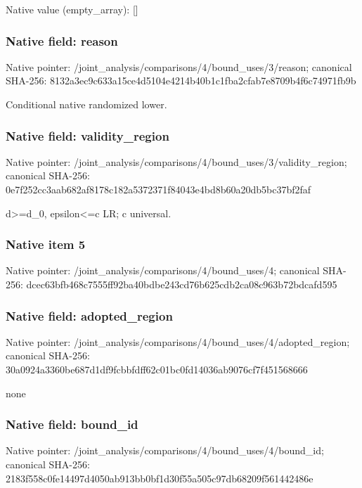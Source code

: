 \documentclass[10pt,a4paper]{article}
\begin{document}
Native value (empty\_\allowbreak{}array): []

\subsubsection{Native field: reason}
Native pointer: /joint\_\allowbreak{}analysis/comparisons/4/bound\_\allowbreak{}uses/3/reason; canonical SHA-256: 8132a3ec9c633a15ce4d5104e4214b40b1c1fba2cfab7e8709b4f6c74971fb9b

\begingroup\raggedright\sloppy Conditional native randomized lower.\par\endgroup

\subsubsection{Native field: validity\_\allowbreak{}region}
Native pointer: /joint\_\allowbreak{}analysis/comparisons/4/bound\_\allowbreak{}uses/3/validity\_\allowbreak{}region; canonical SHA-256: 0e7f252cc3aab682af8178c182a5372371f84043e4bd8b60a20db5bc37bf2faf

\begingroup\raggedright\sloppy d>=\allowbreak{}d\_\allowbreak{}0,\allowbreak{} epsilon<=\allowbreak{}c LR;\allowbreak{} c universal.\par\endgroup

\subsubsection{Native item 5}
Native pointer: /joint\_\allowbreak{}analysis/comparisons/4/bound\_\allowbreak{}uses/4; canonical SHA-256: dcec63bfb468c7555ff92ba40bdbe243cd76b625cdb2ca08c963b72bdcafd595

\subsubsection{Native field: adopted\_\allowbreak{}region}
Native pointer: /joint\_\allowbreak{}analysis/comparisons/4/bound\_\allowbreak{}uses/4/adopted\_\allowbreak{}region; canonical SHA-256: 30a0924a3360be687d1df9fcbbfdff62c01bc0fd14036ab9076cf7f451568666

\begingroup\raggedright\sloppy none\par\endgroup

\subsubsection{Native field: bound\_\allowbreak{}id}
Native pointer: /joint\_\allowbreak{}analysis/comparisons/4/bound\_\allowbreak{}uses/4/bound\_\allowbreak{}id; canonical SHA-256: 2183f558c0fe14497d4050ab913bb0bf1d30f55a505c97db68209f561442486e
\end{document}
